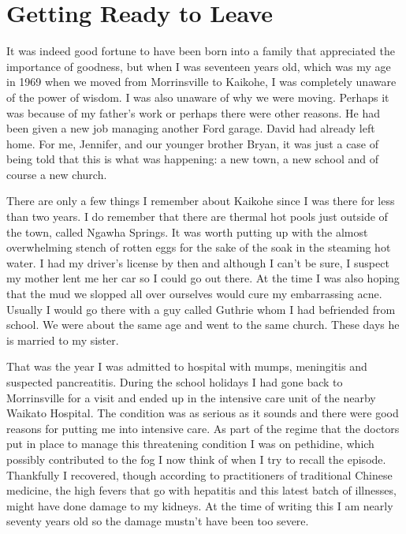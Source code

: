 \chapter{Getting Ready to Leave}

\enlargethispage{\baselineskip}

It was indeed good fortune to have been born into a family that
appreciated the importance of goodness, but when I was seventeen years
old, which was my age in 1969 when we moved from Morrinsville to
Kaikohe, I was completely unaware of the power of wisdom. I was also
unaware of why we were moving. Perhaps it was because of my father's
work or perhaps there were other reasons. He had been given a new job
managing another Ford garage. David had already left home. For me,
Jennifer, and our younger brother Bryan, it was just a case of being
told that this is what was happening: a new town, a new school and of
course a new church.

There are only a few things I remember about Kaikohe since I was there
for less than two years. I do remember that there are thermal hot pools
just outside of the town, called Ngawha Springs. It was worth putting up
with the almost overwhelming stench of rotten eggs for the sake of the
soak in the steaming hot water. I had my driver's license by then and
although I can't be sure, I suspect my mother lent me her car so I could
go out there. At the time I was also hoping that the mud we slopped all
over ourselves would cure my embarrassing acne. Usually I would go there
with a guy called Guthrie whom I had befriended from school. We were
about the same age and went to the same church. These days he is married
to my sister.

That was the year I was admitted to hospital with mumps, meningitis and
suspected pancreatitis. During the school holidays I had gone back to
Morrinsville for a visit and ended up in the intensive care unit of the
nearby Waikato Hospital. The condition was as serious as it sounds and
there were good reasons for putting me into intensive care. As part of
the regime that the doctors put in place to manage this threatening
condition I was on pethidine, which possibly contributed to the fog I
now think of when I try to recall the episode. Thankfully I recovered,
though according to practitioners of traditional Chinese medicine, the
high fevers that go with hepatitis and this latest batch of illnesses,
might have done damage to my kidneys. At the time of writing this I am
nearly seventy years old so the damage mustn't have been too severe.

